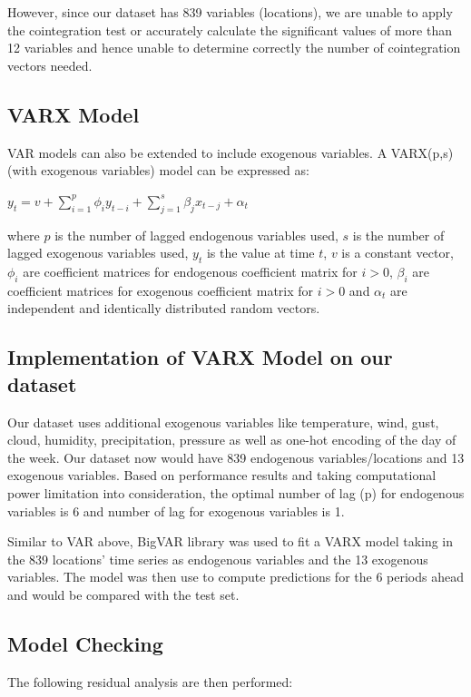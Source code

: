 \documentclass[12pt, letterpaper] {article}
\begin{document}
\noindent However, since our dataset has 839 variables (locations), we are unable to apply the cointegration test or accurately calculate the significant values of more than 12 variables and hence unable to determine correctly the number of cointegration vectors needed. 

\subsection{VARX Model}
VAR models can also be extended to include exogenous variables. A VARX(p,s) (with exogenous variables) model can be expressed as:

\begin{center}
    $\displaystyle y_t=v+\sum_{i=1}^{p} \phi_{i}y_{t-i}+\sum_{j=1}^{s} \beta_{j}x_{t-j}+\alpha_t$
\end{center}

\noindent where $p$ is the number of lagged endogenous variables used, $s$ is the number of lagged exogenous variables used, $y_t$ is the value at time $t$, $v$ is a constant vector, $\phi_i$ are coefficient matrices for endogenous coefficient matrix for $i>0$, $\beta_i$ are coefficient matrices for exogenous coefficient matrix for $i>0$ and $\alpha_t$ are independent and identically distributed random vectors. 

\subsection{Implementation of VARX Model on our dataset}
\noindent Our dataset uses additional exogenous variables like temperature, wind, gust, cloud, humidity, precipitation, pressure as well as one-hot encoding of the day of the week. Our dataset now would have 839 endogenous variables/locations and 13 exogenous variables. Based on performance results and taking computational power limitation into consideration, the optimal number of lag (p) for endogenous variables is 6 and number of lag for exogenous variables is 1.

\noindent Similar to VAR above, BigVAR library was used to fit a VARX model taking in the 839 locations' time series as endogenous variables and the 13 exogenous variables. The model was then use to compute predictions for the 6 periods ahead and would be compared with the test set.

\subsection{Model Checking}
The following residual analysis are then performed:
\end{document}
